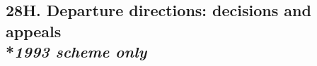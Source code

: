 \documentclass[12pt,a4paper]{article}
\begin{document}
%
%
%
%
%
%
%
%
%

\subsection[28H. Departure directions: decisions and appeals --- \emph{1993 scheme only}]{28H. Departure directions: decisions and appeals\\*\emph{1993 scheme only}}
\end{document}
